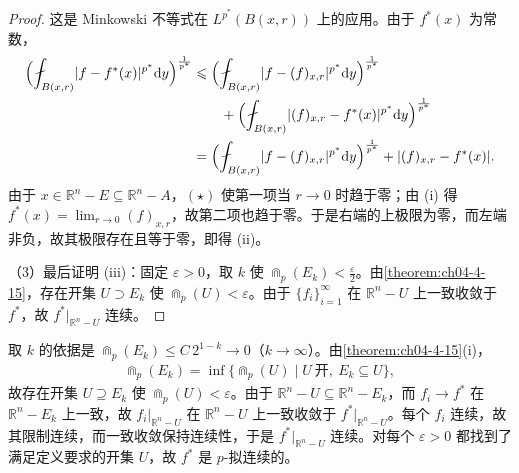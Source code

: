 \documentclass[../../main.tex]{subfiles}%
\begin{document}
\begin{proof}
这是 Minkowski 不等式在 $L^{p^*}(B(x,r))$ 上的应用。由于 $f^*(x)$ 为常数，
\begin{align*}
\Bigl(\fint_{B(x,r)}\lvert f-f^*(x)\rvert^{p^*}\diff y\Bigr)^{\frac{1}{p^*}}
&\leqslant\Bigl(\fint_{B(x,r)}\lvert f-(f)_{x,r}\rvert^{p^*}\diff y\Bigr)^{\frac{1}{p^*}}\\
&\qquad+\Bigl(\fint_{B(x,r)}\lvert(f)_{x,r}-f^*(x)\rvert^{p^*}\diff y\Bigr)^{\frac{1}{p^*}}\\
&=\Bigl(\fint_{B(x,r)}\lvert f-(f)_{x,r}\rvert^{p^*}\diff y\Bigr)^{\frac{1}{p^*}}+\lvert(f)_{x,r}-f^*(x)\rvert .
\end{align*}
由于 $x\in\mathbb{R}^n-E\subseteq\mathbb{R}^n-A$，$(\star)$ 使第一项当 $r\to0$ 时趋于零；由 (i) 得 $f^*(x)=\lim_{r\to0}(f)_{x,r}$，故第二项也趋于零。于是右端的上极限为零，而左端非负，故其极限存在且等于零，即得 (ii)。

（3）最后证明 (iii)：固定 $\varepsilon>0$，取 $k$ 使 $\Cap_p(E_k)<\frac{\varepsilon}{2}$。由\cref{theorem:ch04-4-15}，存在开集 $U\supset E_k$ 使 $\Cap_p(U)<\varepsilon$。由于 $\{f_i\}_{i=1}^{\infty}$ 在 $\mathbb{R}^n-U$ 上一致收敛于 $f^*$，故 $f^*|_{\mathbb{R}^n-U}$ 连续。%
\end{proof}

取 $k$ 的依据是 $\Cap_p(E_k)\leqslant C\,2^{1-k}\to0$（$k\to\infty$）。由\cref{theorem:ch04-4-15}(i)， %
\begin{align*}
\Cap_p(E_k)=\inf\{\Cap_p(U)\mid U\ \text{开},\ E_k\subseteq U\} ,
\end{align*}
故存在开集 $U\supseteq E_k$ 使 $\Cap_p(U)<\varepsilon$。由于 $\mathbb{R}^n-U\subseteq\mathbb{R}^n-E_k$，而 $f_i\to f^*$ 在 $\mathbb{R}^n-E_k$ 上一致，故 $f_i|_{\mathbb{R}^n-U}$ 在 $\mathbb{R}^n-U$ 上一致收敛于 $f^*|_{\mathbb{R}^n-U}$。每个 $f_i$ 连续，故其限制连续，而一致收敛保持连续性，于是 $f^*|_{\mathbb{R}^n-U}$ 连续。对每个 $\varepsilon>0$ 都找到了满足定义要求的开集 $U$，故 $f^*$ 是 $p$-拟连续的。%
\end{document}
